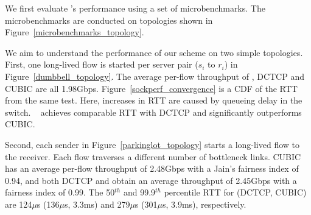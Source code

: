 We first evaluate \acdc{}'s performance using a set of microbenchmarks.
The microbenchmarks are conducted on topologies shown in Figure~\ref{microbenchmarks_topology}.

We aim to understand the performance of our scheme on two simple topologies.
First, one long-lived flow is started per server pair ($s_i$ to $r_i$) in Figure~\ref{dumbbell_topology}. 
The average per-flow throughput of \acdc{}, DCTCP and CUBIC are all 1.98Gbps.
Figure~\ref{sockperf_convergence} is a CDF of the RTT
from the same test. Here, increases in RTT are caused by queueing delay in the switch.
~\acdc{} achieves comparable RTT with DCTCP and significantly outperforms CUBIC.

Second, each sender in Figure~\ref{parkinglot_topology} starts a long-lived
flow to the receiver. Each flow traverses a different number of 
bottleneck links. CUBIC has an average per-flow throughput of 2.48Gbps with
a Jain's fairness index of 0.94, and
both DCTCP and \acdc{} obtain an average throughput of 2.45Gbps with a
fairness index of 0.99. 
The 50$^{th}$ and 99.9$^{th}$ percentile RTT for
\acdc{} (DCTCP, CUBIC) are 124$\mu$s (136$\mu$s, 3.3ms) and
279$\mu$s (301$\mu$s, 3.9ms), respectively.


